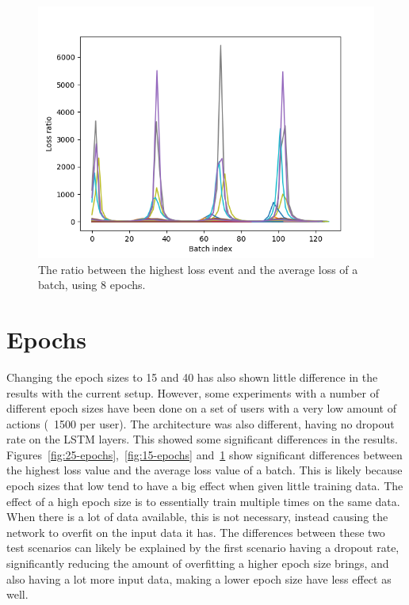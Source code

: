 \begin{figure}
	\begin{center}
		\includegraphics[scale=0.1]{experiments/epochs/8-epochs}
	\end{center}
	\caption{The ratio between the highest loss event and the average loss of a batch, using 8 epochs.~\label{fig:8-epochs}}
\end{figure}

\section{Epochs}
Changing the epoch sizes to 15 and 40 has also shown little difference in the results with the current setup. However, some experiments with a number of different epoch sizes have been done on a set of users with a very low amount of actions (~1500 per user). The architecture was also different, having no dropout rate on the LSTM layers. This showed some significant differences in the results. Figures~\ref{fig:25-epochs},~\ref{fig:15-epochs} and~\ref{fig:8-epochs} show significant differences between the highest loss value and the average loss value of a batch. This is likely because epoch sizes that low tend to have a big effect when given little training data. The effect of a high epoch size is to essentially train multiple times on the same data. When there is a lot of data available, this is not necessary, instead causing the network to overfit on the input data it has. The differences between these two test scenarios can likely be explained by the first scenario having a dropout rate, significantly reducing the amount of overfitting a higher epoch size brings, and also having a lot more input data, making a lower epoch size have less effect as well.


